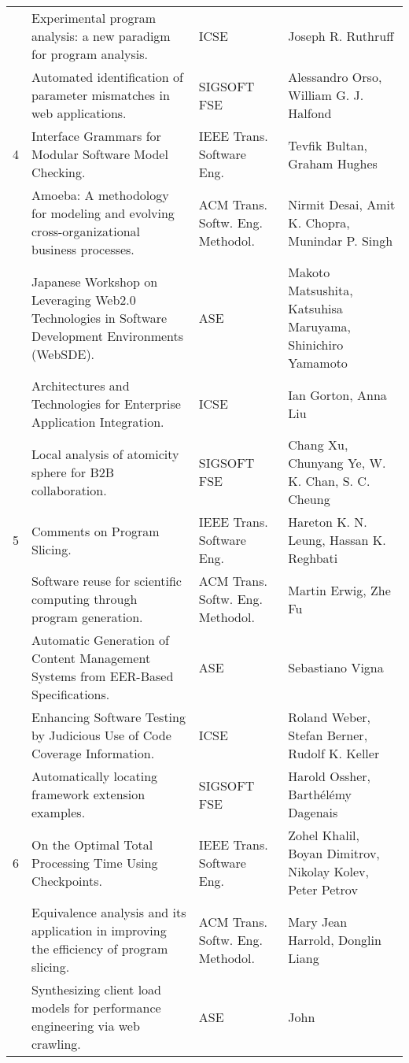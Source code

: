 \begin{center}
\begin{longtable}{|p{}p{}p{}p{}|}
	& Experimental program analysis: a new paradigm for program analysis.& ICSE& Joseph R. 
Ruthruff \\
\rowcolor{black!20}	& Automated identification of parameter mismatches in web applications.& 
SIGSOFT FSE& Alessandro Orso, William G. J. Halfond \\
    4	& Interface Grammars for Modular Software Model Checking.& IEEE Trans. Software Eng.& 
Tevfik 
Bultan, Graham Hughes \\
\rowcolor{black!20}	& Amoeba: A methodology for modeling and evolving cross-organizational 
business processes.& ACM Trans. Softw. Eng. Methodol.& Nirmit Desai, Amit K. Chopra, Munindar P. 
Singh \\
	& Japanese Workshop on Leveraging Web2.0 Technologies in Software Development Environments 
(WebSDE).& ASE& Makoto Matsushita, Katsuhisa Maruyama, Shinichiro Yamamoto \\
\rowcolor{black!20}	& Architectures and Technologies for Enterprise Application Integration.& 
ICSE& Ian Gorton, Anna Liu \\
	& Local analysis of atomicity sphere for B2B collaboration.& SIGSOFT FSE& Chang Xu, 
Chunyang Ye, W. K. Chan, S. C. Cheung \\
\rowcolor{black!20}    5	& Comments on Program Slicing.& IEEE Trans. Software Eng.& Hareton 
K. N. Leung, Hassan K. Reghbati \\
	& Software reuse for scientific computing through program generation.& ACM Trans. Softw. 
Eng. Methodol.& Martin Erwig, Zhe Fu \\
\rowcolor{black!20}	& Automatic Generation of Content Management Systems from EER-Based 
Specifications.& ASE& Sebastiano Vigna \\
	& Enhancing Software Testing by Judicious Use of Code Coverage Information.& ICSE& Roland 
Weber, Stefan Berner, Rudolf K. Keller \\
\rowcolor{black!20}	& Automatically locating framework extension examples.& SIGSOFT FSE& Harold 
Ossher, Barthélémy Dagenais \\
    6	& On the Optimal Total Processing Time Using Checkpoints.& IEEE Trans. Software Eng.& Zohel 
Khalil, Boyan Dimitrov, Nikolay Kolev, Peter Petrov \\
\rowcolor{black!20}	& Equivalence analysis and its application in improving the efficiency of 
program slicing.& ACM Trans. Softw. Eng. Methodol.& Mary Jean Harrold, Donglin Liang \\
	& Synthesizing client load models for performance engineering via web crawling.& ASE& John 

\end{longtable}
\end{center}
